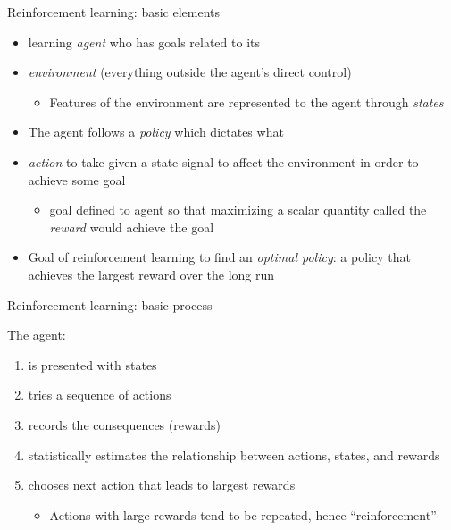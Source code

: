 \documentclass{beamer}
\begin{document}
\begin{frame}[c]{Reinforcement learning: basic elements}

\begin{itemize}[<+->]
  \item learning \emph{agent} who has goals related to its
  \item \emph{environment} (everything outside the agent's direct control)
  \begin{itemize}
    \item Features of the environment are represented to the agent through \emph{states}
  \end{itemize}
  \item The agent follows a \emph{policy} which dictates what 
  \item \emph{action} to take given a state signal to affect the environment in order to achieve some goal
  \begin{itemize}
    \item goal defined to agent so that maximizing a scalar quantity called the \emph{reward} would achieve the goal
  \end{itemize}
  \item Goal of reinforcement learning to find an \emph{optimal policy}: a policy that achieves the largest reward over the long run 
\end{itemize}

\end{frame}

\begin{frame}[c]{Reinforcement learning: basic process}

The agent:
\begin{enumerate}[<+->]
  \item is presented with states
  \item tries a sequence of actions
  \item records the consequences (rewards)
  \item statistically estimates the relationship between actions, states, and rewards
  \item chooses next action that leads to largest rewards
  \begin{itemize}
    \item Actions with large rewards tend to be repeated, hence ``reinforcement''
  \end{itemize}
\end{enumerate}
\end{frame}
\end{document}
